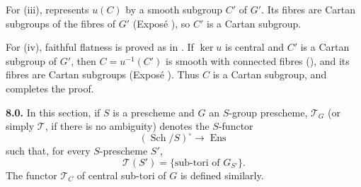 For (iii),  represents \(u(C)\) by a smooth
subgroup \(C'\) of \(G'\). Its fibres are Cartan subgroups of the
fibres of \(G'\) (Exposé ), so \(C'\) is a Cartan subgroup.

For (iv), faithful flatness is proved as in .
If \(\ker u\) is central and \(C'\) is a Cartan subgroup of \(G'\),
then \(C=u^{-1}(C')\) is smooth with connected fibres
(), and its fibres are Cartan subgroups (Exposé
). Thus \(C\) is a Cartan subgroup, and  completes the proof.




\medskip\noindent{}\textbf{8.0.}
In this section, if \(S\) is a prescheme and \(G\) an \(S\)-group
prescheme, \(\mathcal T_G\) (or simply \(\mathcal T\), if there is no
ambiguity) denotes the \(S\)-functor
\[
  (\operatorname{Sch}/S)^\circ\longrightarrow\operatorname{Ens}
\]
such that, for every \(S\)-prescheme \(S'\),
\[
  \mathcal T(S')=\{\text{sub-tori of \(G_{S'}\)}\}.
\]
The functor \(\mathcal T_C\) of central sub-tori of \(G\) is defined
similarly.

